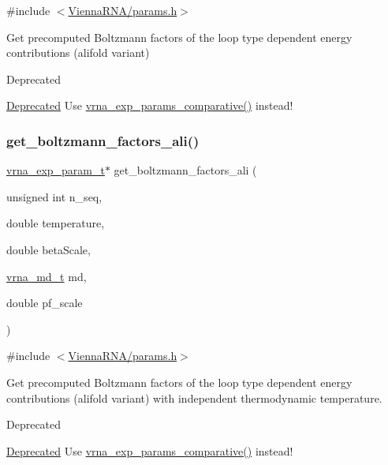 {\ttfamily \#include $<$\hyperlink{params_8h}{Vienna\+R\+N\+A/params.\+h}$>$}



Get precomputed Boltzmann factors of the loop type dependent energy contributions (alifold variant) 

\begin{DoxyRefDesc}{Deprecated}
\item[\hyperlink{deprecated__deprecated000095}{Deprecated}]Use \hyperlink{group__energy__parameters_gaf78c09e685e6eef4100b1a41d4042550}{vrna\+\_\+exp\+\_\+params\+\_\+comparative()} instead!\end{DoxyRefDesc}
\mbox{\label{group__energy__parameters_ga2aa1d87c97f35d2e4121634a17556829}} 
\subsubsection{\texorpdfstring{get\+\_\+boltzmann\+\_\+factors\+\_\+ali()}{get\_boltzmann\_factors\_ali()}}
{\footnotesize\ttfamily \hyperlink{group__energy__parameters_ga01d8b92fe734df8d79a6169482c7d8d8}{vrna\+\_\+exp\+\_\+param\+\_\+t}$\ast$ get\+\_\+boltzmann\+\_\+factors\+\_\+ali (\begin{DoxyParamCaption}\item[{unsigned int}]{n\+\_\+seq,  }\item[{double}]{temperature,  }\item[{double}]{beta\+Scale,  }\item[{\hyperlink{group__model__details_ga1f8a10e12a0a1915f2a4eff0b28ea17c}{vrna\+\_\+md\+\_\+t}}]{md,  }\item[{double}]{pf\+\_\+scale }\end{DoxyParamCaption})}



{\ttfamily \#include $<$\hyperlink{params_8h}{Vienna\+R\+N\+A/params.\+h}$>$}



Get precomputed Boltzmann factors of the loop type dependent energy contributions (alifold variant) with independent thermodynamic temperature. 

\begin{DoxyRefDesc}{Deprecated}
\item[\hyperlink{deprecated__deprecated000096}{Deprecated}]Use \hyperlink{group__energy__parameters_gaf78c09e685e6eef4100b1a41d4042550}{vrna\+\_\+exp\+\_\+params\+\_\+comparative()} instead!\end{DoxyRefDesc}
\mbox{\label{group__energy__parameters_ga541f2cf7436e9bc939b0a49b24baf987}} 
